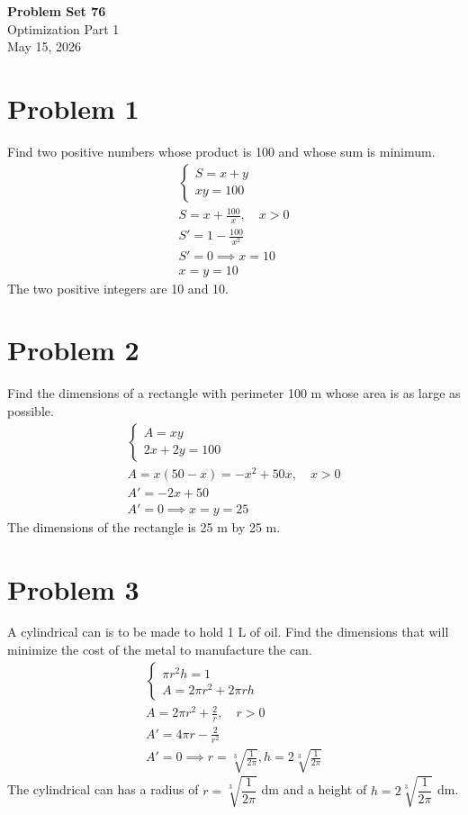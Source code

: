 \documentclass[12pt]{article}
\newcommand*{\cbrt}[1]{\ensuremath{\sqrt[3]{#1}}}
\newcommand{\problem}[1]{\section{Problem #1}}
\begin{document}
\vspace*{0cm}

\begin{center}
    {\Large \bfseries Problem Set 76} \\[0.5cm]
    {\large Optimization Part 1} \\[0.35cm]
    {\normalsize May 15, 2026}
\end{center}


\problem{1}
Find two positive numbers whose product is 100 and whose sum is minimum.
\begin{gather*}
    \begin{cases}
        S=x+y\\
        xy=100
    \end{cases}\\
    S=x+\frac{100}{x}, \quad x>0\\
    S'=1-\frac{100}{x^2}\\
    S'=0 \implies x=10\\
    \boxed{x=y=10}
\end{gather*}
The two positive integers are 10 and 10.

\problem{2}
Find the dimensions of a rectangle with perimeter 100 m whose area is as large as possible.
\begin{gather*}
    \begin{cases}
        A=xy\\
        2x+2y=100
    \end{cases}\\
    A=x(50-x)=-x^2+50x, \quad x>0\\
    A'=-2x+50\\
    A'=0 \implies \boxed{x=y=25}
\end{gather*}
The dimensions of the rectangle is 25 m by 25 m.

\problem{3}
A cylindrical can is to be made to hold 1 L of oil. Find the dimensions that will minimize the cost of the metal to manufacture the can.
\begin{gather*}
    \begin{cases}
        \pi r^2h=1\\
        A=2\pi r^2+2\pi rh
    \end{cases}\\
    A=2\pi r^2+\frac{2}{r}, \quad r>0\\
    A'=4\pi r-\frac{2}{r^2}\\
    A'=0 \implies \boxed{r=\cbrt{\frac{1}{2\pi}}, h=2\cbrt{\frac{1}{2\pi}}}
\end{gather*}
The cylindrical can has a radius of $r=\cbrt{\dfrac{1} {2\pi}}$ dm and a height of $h=2\cbrt{\dfrac{1}{2\pi}}$ dm.
\end{document}
